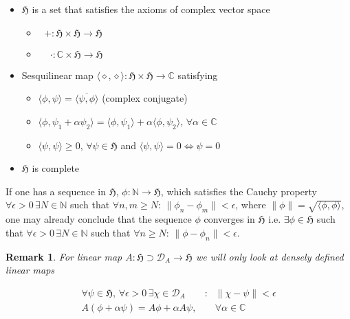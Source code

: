 \documentclass{article}
\newtheorem{remark}{Remark}
\begin{document}
\begin{itemize}
\item $\mathfrak{H}$ is a set that satisfies the axioms of complex vector space

\begin{itemize}
\item $\phantom{\cdot}+:\mathfrak{H}\times\mathfrak{H}\rightarrow\mathfrak{H}$
\item $\phantom{+}\cdot:\mathbb{C}\times\mathfrak{H}\rightarrow\mathfrak{H}$
\end{itemize}

\item Sesquilinear map $\langle\diamond,\diamond\rangle:\mathfrak{H}\times\mathfrak{H}\rightarrow\mathbb{C}$ satisfying

\begin{itemize}
\item $\langle\phi,\psi\rangle = \overline{\langle\psi,\phi\rangle}$ (complex conjugate)
\item $\langle\phi,\psi_1 + \alpha\psi_2\rangle = \langle\phi,\psi_1\rangle + \alpha\langle\phi,\psi_2\rangle$, $\forall \alpha \in \mathbb{C}$
\item $\langle\psi,\psi\rangle \geq 0$, $\forall \psi \in \mathfrak{H}$ and $\langle\psi,\psi\rangle = 0 \Leftrightarrow \psi = 0$
\end{itemize}

\item $\mathfrak{H}$ is complete
\end{itemize}

If one has a sequence in $\mathfrak{H}$, $\phi:\mathbb{N}\rightarrow\mathfrak{H}$, which satisfies the Cauchy property $\forall\epsilon > 0\,\exists N \in \mathbb{N}$ such that $\forall n,m \geq N$: $\|\phi_n - \phi_m\| < \epsilon$, where $\|\phi\| = \sqrt{\langle\phi,\phi\rangle}$, one may already conclude that the sequence $\phi$ converges in $\mathfrak{H}$ i.e. $\exists\phi\in\mathfrak{H}$ such that $\forall\epsilon > 0\,\exists N \in \mathbb{N}$ such that $\forall n \geq N$: $\|\phi - \phi_n\| < \epsilon$.

\begin{remark}
For linear map $A:\mathfrak{H} \supset \mathcal{D}_A \rightarrow \mathfrak{H}$ we will only look at densely defined linear maps

\begin{align*}
\forall\psi\in\mathfrak{H}, \,\forall\epsilon > 0 \,\exists \chi\in\mathcal{D}_A &: & \|\chi - \psi\| < \epsilon \\
A(\phi + \alpha\psi) = A\phi + \alpha A\psi, & & \forall \alpha \in \mathbb{C}
\end{align*}

\end{remark}
\end{document}
